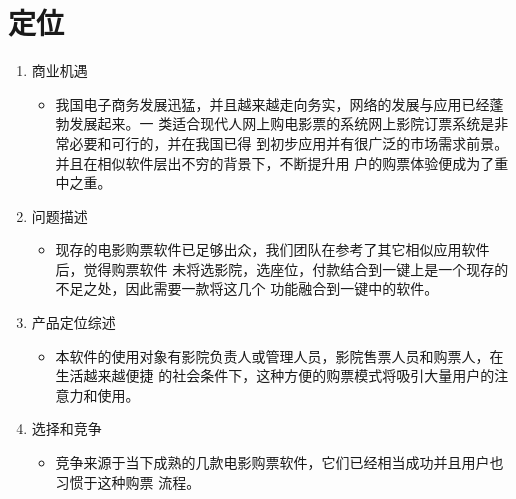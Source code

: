 \documentclass[a4paper]{article}
\begin{document}
\section{定位}
\begin{enumerate}
  \item 商业机遇
  \begin{itemize}
    \item 我国电子商务发展迅猛，并且越来越走向务实，网络的发展与应用已经蓬勃发展起来。一
类适合现代人网上购电影票的系统网上影院订票系统是非常必要和可行的，并在我国已得
到初步应用并有很广泛的市场需求前景。 并且在相似软件层出不穷的背景下，不断提升用
户的购票体验便成为了重中之重。
  \end{itemize}
  \item 问题描述
  \begin{itemize}
    \item 现存的电影购票软件已足够出众，我们团队在参考了其它相似应用软件后，觉得购票软件
未将选影院，选座位，付款结合到一键上是一个现存的不足之处，因此需要一款将这几个
功能融合到一键中的软件。
  \end{itemize}
  \item 产品定位综述
  \begin{itemize}
    \item 本软件的使用对象有影院负责人或管理人员，影院售票人员和购票人，在生活越来越便捷
的社会条件下，这种方便的购票模式将吸引大量用户的注意力和使用。
  \end{itemize}
  \item 选择和竞争
  \begin{itemize}
    \item 竞争来源于当下成熟的几款电影购票软件，它们已经相当成功并且用户也习惯于这种购票
流程。
  \end{itemize}
\end{enumerate}
\end{document}
